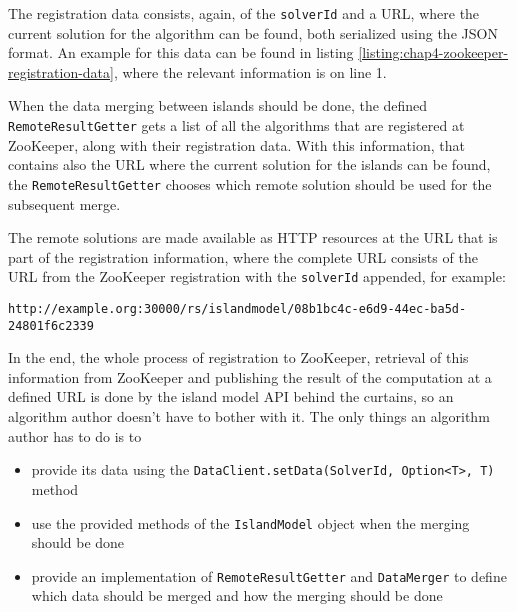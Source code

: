     The registration data consists, again, of the \texttt{solverId} and a URL, where the current solution for the algorithm can be found, both serialized using the JSON format. An example for this data can be found in listing \ref{listing:chap4-zookeeper-registration-data}, where the relevant information is on line 1.
    
    
      
    When the data merging between islands should be done, the defined \texttt{RemoteResultGetter} gets a list of all the algorithms that are registered at ZooKeeper, along with their registration data. With this information, that contains also the URL where the current solution for the islands can be found, the \texttt{RemoteResultGetter} chooses which remote solution should be used for the subsequent merge.
    
    The remote solutions are made available as HTTP resources at the URL that is part of the registration information, where the complete URL consists of the URL from the ZooKeeper registration with the \texttt{solverId} appended, for example:
    
    \begin{lstlisting}
http://example.org:30000/rs/islandmodel/08b1bc4c-e6d9-44ec-ba5d-24801f6c2339
    \end{lstlisting}  
    
    In the end, the whole process of registration to ZooKeeper, retrieval of this information from ZooKeeper and publishing the result of the computation at a defined URL is done by the island model API behind the curtains, so an algorithm author doesn't have to bother with it. The only things an algorithm author has to do is to
    \begin{itemize}
      \item provide its data using the \texttt{DataClient.setData(SolverId, Option<T>, T)} method
      \item use the provided methods of the \texttt{IslandModel} object when the merging should be done
      \item provide an implementation of \texttt{RemoteResultGetter} and \texttt{DataMerger} to define which data should be merged and how the merging should be done
    \end{itemize}

